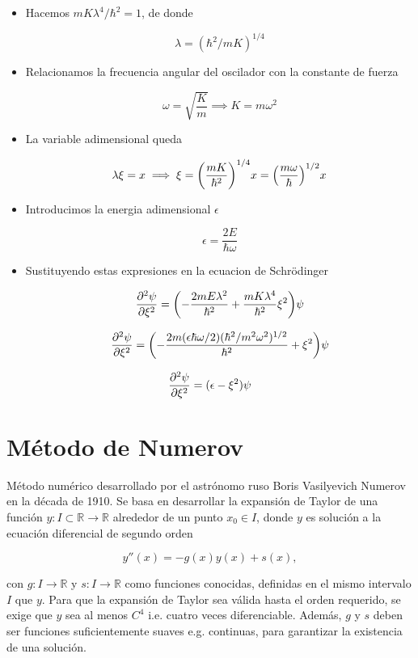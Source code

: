 \documentclass[11pt]{article}
\begin{document}
\begin{itemize}
\item Hacemos \(mK\lambda^4 /\hbar^2 = 1\), de donde

\[ \lambda = (\hbar^2/mK)^{1/4} \]

\item Relacionamos la frecuencia angular del oscilador con la constante de fuerza

\[ \omega = \sqrt{\frac{K}{m}} \implies K = m\omega^2 \]

\item La variable adimensional queda

\[ \lambda\xi = x \implies \xi=\qty(\frac{mK}{\hbar^2})^{1/4} x = \qty(\frac{m \omega}{\hbar})^{1/2} x  \]

\item Introducimos la energia adimensional \(\epsilon\)

\[ \epsilon = \frac{2E}{\hbar \omega} \]

\item Sustituyendo estas expresiones en la ecuacion de Schrödinger

\[ \pdv[2]{\psi}{\xi} = \qty( - \frac{2m E \lambda^{2}}{\hbar^2} + \frac{mK \lambda^4}{\hbar^2} \xi^2  )\psi \]

\[ \pdv[2]{\psi}{\xi} = \qty( - \frac{2m (\epsilon \hbar \omega/2) (\hbar^2/m^2\omega^2)^{1/2}}{\hbar^2} +  \xi^2  )\psi \]
\end{itemize}


\[ \pdv[2]{\psi}{\xi} = (\epsilon - \xi^2)\psi \]
\section{Método de Numerov}
\label{sec:org460d9ed}

Método numérico desarrollado por el astrónomo ruso Boris Vasilyevich Numerov en la década de 1910. Se basa en desarrollar la expansión de Taylor de una función \(y : I \subset \mathbb{R} \to \mathbb{R}\) alrededor de un punto \(x_0 \in I\), donde \(y\) es solución a la ecuación diferencial de segundo orden

\[ y''(x) = - g(x)y(x) + s(x), \]

con \(g: I \to \mathbb{R}\) y \(s: I \to \mathbb{R}\) como funciones conocidas, definidas en el mismo intervalo \(I\) que \(y\). Para que la expansión de Taylor sea válida hasta el orden requerido, se exige que \(y\) sea al menos \(C^4\) i.e. cuatro veces diferenciable. Además, \(g\) y \(s\) deben ser funciones suficientemente suaves e.g. continuas, para garantizar la existencia de una solución.
\end{document}
